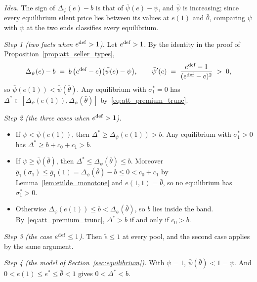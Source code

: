 \upshape
\emph{Idea.} The sign of $\Delta_\psi(e)-b$ is that of $\bar\psi(e)-\psi$, and $\bar\psi$ is increasing; since every equilibrium silent price lies between its values at $e(1)$ and $\bar\theta$, comparing $\psi$ with $\bar\psi$ at the two ends classifies every equilibrium.

\emph{Step 1 (two facts when $e^{\rm def}>1$).} Let $e^{\rm def}>1$. By the identity in the proof of Proposition~\ref{prop:att_seller_types},
\begin{equation*}
    \Delta_\psi(e)-b\;=\;b\,\big(e^{\rm def}-e\big)\big(\bar\psi(e)-\psi\big),\qquad
    \bar\psi'(e)\;=\;\frac{e^{\rm def}-1}{(e^{\rm def}-e)^2}\;>\;0,
\end{equation*}
so $\bar\psi(e(1))<\bar\psi(\bar\theta)$. Any equilibrium with $\sigma_1^*=0$ has $\Delta^*\in[\Delta_\psi(e(1)),\Delta_\psi(\bar\theta)]$ by~\eqref{eq:att_premium_trunc}.

\emph{Step 2 (the three cases when $e^{\rm def}>1$).}
\begin{itemize}
    \item If $\psi<\bar\psi(e(1))$, then $\Delta^*\ge\Delta_\psi(e(1))>b$. Any equilibrium with $\sigma_1^*>0$ has $\Delta^*\ge b+c_0+c_1>b$.
    \item If $\psi\ge\bar\psi(\bar\theta)$, then $\Delta^*\le\Delta_\psi(\bar\theta)\le b$. Moreover $\bar g_1(\sigma_1)\le\bar g_1(1)=\Delta_\psi(\bar\theta)-b\le0<c_0+c_1$ by Lemma~\ref{lem:etilde_monotone} and $e(1,1)=\bar\theta$, so no equilibrium has $\sigma_1^*>0$.
    \item Otherwise $\Delta_\psi(e(1))\le b<\Delta_\psi(\bar\theta)$, so $b$ lies inside the band. By~\eqref{eq:att_premium_trunc}, $\Delta^*>b$ if and only if $c_0>b$.
\end{itemize}

\emph{Step 3 (the case $e^{\rm def}\le1$).} Then $\tilde e\le1$ at every pool, and the second case applies by the same argument.

\emph{Step 4 (the model of Section~\ref{sec:equilibrium}).} With $\psi=1$, $\bar\psi(\bar\theta)<1=\psi$. And $0<e(1)\le e^*\le\bar\theta<1$ gives $0<\Delta^*<b$.
